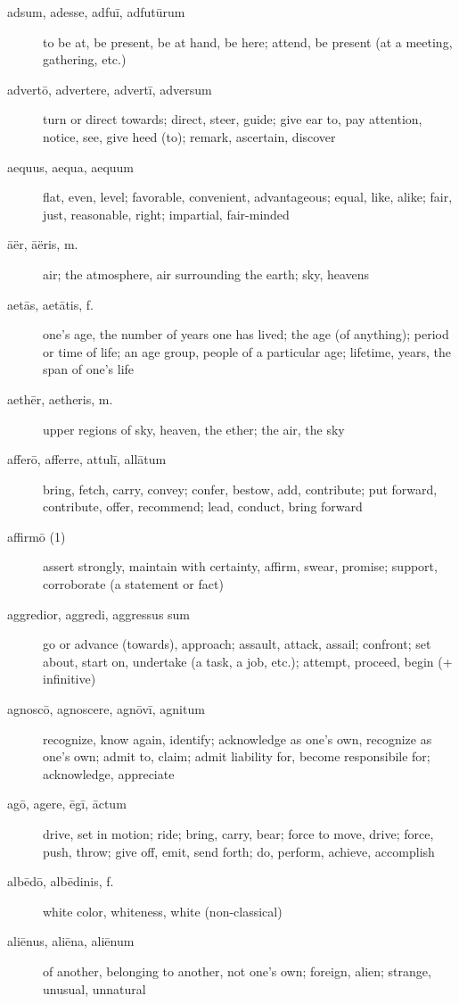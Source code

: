 \begin{description}
    \item[adsum, adesse, adfuī, adfutūrum] \marginnote{*}to be at, be present, be at hand, be here; attend, be present (at a meeting, gathering, etc.)
    \item[advertō, advertere, advertī, adversum] \marginnote{*}turn or direct towards; direct, steer, guide; give ear to, pay attention, notice, see, give heed (to); remark, ascertain, discover
    \item[aequus, aequa, aequum] \marginnote{*}flat, even, level; favorable, convenient, advantageous; equal, like, alike; fair, just, reasonable, right; impartial, fair-minded
    \item[āër, āëris, m.] \marginnote{*}air; the atmosphere, air surrounding the earth; sky, heavens
    \item[aetās, aetātis, f.] \marginnote{*}one's age, the number of years one has lived; the age (of anything); period or time of life; an age group, people of a particular age; lifetime, years, the span of one's life
    \item[aethēr, aetheris, m.] \marginnote{*}upper regions of sky, heaven, the ether; the air, the sky
    \item[afferō, afferre, attulī, allātum] \marginnote{*}bring, fetch, carry, convey; confer, bestow, add, contribute; put forward, contribute, offer, recommend; lead, conduct, bring forward
    \item[affirmō (1)] assert strongly, maintain with certainty, affirm, swear, promise; support, corroborate (a statement or fact)
    \item[aggredior, aggredi, aggressus sum] \marginnote{*}go or advance (towards), approach; assault, attack, assail; confront; set about, start on, undertake (a task, a job, etc.); attempt, proceed, begin (+ infinitive)
    \item[agnoscō, agnoscere, agnōvī, agnitum] \marginnote{*}recognize, know again, identify; acknowledge as one's own, recognize as one's own; admit to, claim; admit liability for, become responsibile for; acknowledge, appreciate
    \item[agō, agere, ēgī, āctum] \marginnote{*}drive, set in motion; ride; bring, carry, bear; force to move, drive; force, push, throw; give off, emit, send forth; do, perform, achieve, accomplish
    \item[albēdō, albēdinis, f.] white color, whiteness, white (non-classical)
    \item[aliēnus, aliēna, aliēnum] \marginnote{*}of another, belonging to another, not one's own; foreign, alien; strange, unusual, unnatural

\end{description}
